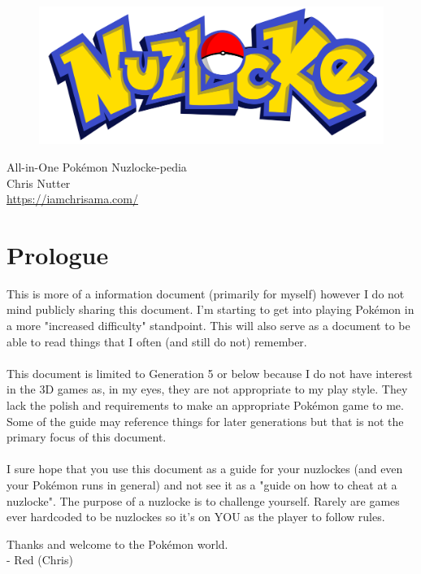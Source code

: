 \documentclass{article}
\begin{document}
\begin{figure}[hbtp]
	 \vspace{8ex}
	 \centering
    \includegraphics[width=13.8cm]{logo.png}
\end{figure}

\begin{center}
	{\Huge All-in-One Pokémon Nuzlocke-pedia}
		\\
		\vspace{10px}
	{\LARGE Chris Nutter}
		\\
		\vspace{7px}
	{\large \href{https://iamchrisama.com/}{https://iamchrisama.com/}}
\end{center}

\newpage 

\tableofcontents
\newpage  
\vspace{4ex}


\section*{\centering Prologue}
	This is more of a information document (primarily for myself) however I do not mind publicly sharing this document. I'm starting to get into playing Pokémon in a more "increased difficulty" standpoint. This will also serve as a document to be able to read things that I often (and still do not) remember.
	\\\\
	This document is limited to Generation 5 or below because I do not have interest in the 3D games as, in my eyes, they are not appropriate to my play style. They lack the polish and requirements to make an appropriate Pokémon game to me. Some of the guide may reference things for later generations but that is not the primary focus of this document.
	\\\\
	I sure hope that you use this document as a guide for your nuzlockes (and even your Pokémon runs in general) and not see it as a "guide on how to cheat at a nuzlocke". The purpose of a nuzlocke is to challenge yourself. Rarely are games ever hardcoded to be nuzlockes so it's on YOU as the player to follow rules.
	\begin{flushright}
		Thanks and welcome to the Pokémon world.
		\\
		- Red (Chris)
	\end{flushright}
\newpage
\end{document}
